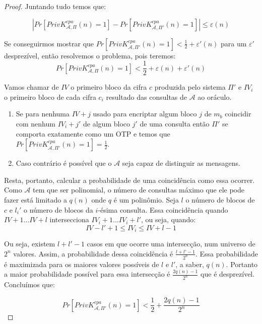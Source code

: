 \begin{proof}
Juntando tudo temos que:

\begin{displaymath}
  |Pr[PrivK^{cpa}_{\mathcal{A},\Pi}(n) = 1] - Pr[PrivK^{cpa}_{\mathcal{A},\Pi'}(n) = 1]| \leq \varepsilon(n)
\end{displaymath}

Se conseguirmos mostrar que $Pr[PrivK^{cpa}_{\mathcal{A},\Pi'}(n) = 1] < \frac{1}{2} + \varepsilon'(n)$ para um $\varepsilon'$ desprezível, então resolvemos o problema, pois teremos:
\begin{displaymath}
  Pr[PrivK^{cpa}_{\mathcal{A},\Pi}(n) = 1] < \frac{1}{2} + \varepsilon(n) + \varepsilon'(n)
\end{displaymath}

Vamos chamar de $IV$ o primeiro bloco da cifra $c$ produzida pelo sistema $\Pi'$ e $IV_i$ o primeiro bloco de cada cifra $c_i$ resultado das consultas de $\mathcal{A}$ ao oráculo.
\begin{enumerate}
\item Se para nenhuma $IV + j$ usado para encriptar algum bloco $j$ de $m_b$ coincidir com nenhum $IV_i + j'$ de algum bloco $j'$ de uma consulta então $\Pi'$ se comporta exatamente como um OTP e temos que $Pr[PrivK^{cpa}_{\mathcal{A},\Pi'}(n) = 1] = \frac{1}{2}$.
\item Caso contrário é possível que o $\mathcal{A}$ seja capaz de distinguir as mensagens.
\end{enumerate}

Resta, portanto, calcular a probabilidade de uma coincidência como essa ocorrer.
Como $\mathcal{A}$ tem que ser polinomial, o número de consultas máximo que ele pode fazer está limitado a $q(n)$ onde $q$ é um polinômio.
Seja $l$ o número de blocos de $c$ e $l_i'$ o número de blocos da $i$-ésima consulta.
Essa coincidência quando $IV + 1 \dots IV + l$ intersecciona $IV_i + 1 \dots IV_i + l'$, ou seja, quando:
\begin{displaymath}
  IV - l' + 1 \leq IV_i \leq IV + l -1
\end{displaymath}

Ou seja, existem $l + l' - 1$ casos em que ocorre uma intersecção, num universo de $2^n$ valores.
Assim, a probabilidade dessa coincidência é $\frac{l + l' -1}{2^n}$.
Essa probabilidade é maximizada para os maiores valores possíveis de $l$ e $l'$, a saber, $q(n)$.
Portanto a maior probabilidade possível para essa intersecção é $\frac{2q(n) - 1}{2^n}$ que é desprezível.
Concluímos que:

\begin{displaymath}
Pr[PrivK^{cpa}_{\mathcal{A},\Pi'}(n) = 1] < \frac{1}{2} + \frac{2q(n) - 1}{2^n}
\end{displaymath}
\end{proof}

